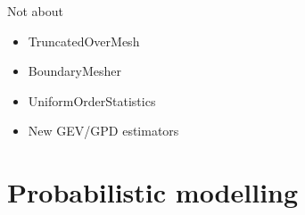 \documentclass[aspectratio=169]{beamer}
\begin{document}
\begin{frame}{Not about}

\begin{itemize}
\item TruncatedOverMesh
\item BoundaryMesher
\item UniformOrderStatistics
\item New GEV/GPD estimators
\end{itemize}

\end{frame}


\section{Probabilistic modelling}
\end{document}
